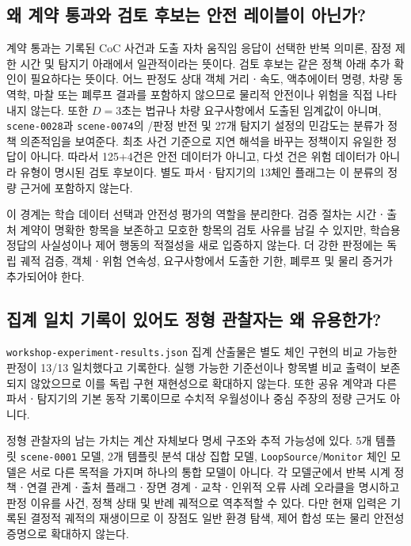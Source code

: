 \begin{figure}[t]
\centering

\label{fig:training-routing}
\end{figure}

\subsection{왜 계약 통과와 검토 후보는 안전 레이블이 아닌가?}

계약 통과는 기록된 CoC 사건과 도출 자차 움직임 응답이 선택한 반복 의미론, 잠정 제한 시간 및 탐지기 아래에서 일관적이라는 뜻이다. 검토 후보는 같은 정책 아래 추가 확인이 필요하다는 뜻이다. 어느 판정도 상대 객체 거리ㆍ속도, 액추에이터 명령, 차량 동역학, 마찰 또는 폐루프 결과를 포함하지 않으므로 물리적 안전이나 위험을 직접 나타내지 않는다. 또한 $D=3$초는 법규나 차량 요구사항에서 도출된 임계값이 아니며, \texttt{scene-0028}과 \texttt{scene-0074}의 \preserve/\reset 판정 반전 및 27개 탐지기 설정의 민감도는 분류가 정책 의존적임을 보여준다.  최초 사건 기준으로 지연 해석을 바꾸는 정책이지 유일한 정답이 아니다. 따라서 125+4건은 안전 데이터가 아니고, 다섯 건은 위험 데이터가 아니라 유형이 명시된 검토 후보이다. 별도 파서ㆍ탐지기의 13체인 플래그는 이 분류의 정량 근거에 포함하지 않는다.

이 경계는 학습 데이터 선택과 안전성 평가의 역할을 분리한다. 검증 절차는 시간ㆍ출처 계약이 명확한 항목을 보존하고 모호한 항목의 검토 사유를 남길 수 있지만, 학습용 정답의 사실성이나 제어 행동의 적절성을 새로 입증하지 않는다. 더 강한 판정에는 독립 궤적 검증, 객체ㆍ위험 연속성, 요구사항에서 도출한 기한, 폐루프 및 물리 증거가 추가되어야 한다.

\subsection{집계 일치 기록이 있어도 정형 관찰자는 왜 유용한가?}

\texttt{workshop-experiment-results.json} 집계 산출물은 별도 체인 구현의 비교 가능한 판정이 13/13 일치했다고 기록한다. 실행 가능한 기준선이나 항목별 비교 출력이 보존되지 않았으므로 이를 독립 구현 재현성으로 확대하지 않는다. 또한 공유 계약과 다른 파서ㆍ탐지기의 기본 동작 기록이므로  수치적 우월성이나 중심 주장의 정량 근거도 아니다.

정형 관찰자의 남는 가치는 계산 자체보다 명세 구조와 추적 가능성에 있다. 5개 템플릿 \texttt{scene-0001} 모델, 2개 템플릿 분석 대상 집합 모델, \texttt{LoopSource}/\texttt{Monitor} 체인 모델은 서로 다른 목적을 가지며 하나의 통합 모델이 아니다. 각 모델군에서 반복 시계 정책ㆍ연결 관계ㆍ출처 플래그ㆍ장면 경계ㆍ교착ㆍ인위적 오류 사례 오라클을 명시하고 판정 이유를 사건, 정책 상태 및 반례 궤적으로 역추적할 수 있다. 다만 현재 입력은 기록된 결정적 궤적의 재생이므로 이 장점도 일반 환경 탐색, 제어 합성 또는 물리 안전성 증명으로 확대하지 않는다.

